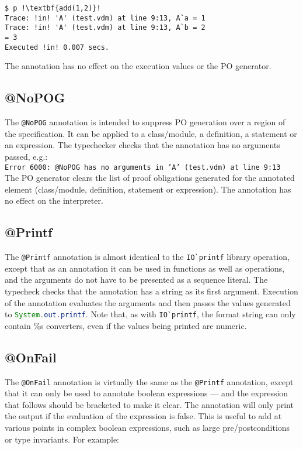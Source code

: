 \begin{lstlisting}[style=tool,escapechar=!]
$ p !\textbf{add(1,2)}!
Trace: !in! 'A' (test.vdm) at line 9:13, A`a = 1
Trace: !in! 'A' (test.vdm) at line 9:13, A`b = 2
= 3
Executed !in! 0.007 secs.
\end{lstlisting}

\noindent The annotation has no effect on the execution values or the
PO generator.

\subsection{@NoPOG}

The \lstinline[language=VDM++]|@NoPOG| annotation is intended to
suppress PO generation over a region of the specification. It can be
applied to a class/module, a definition, a statement or an
expression. The typechecker checks
that the annotation has no arguments passed, e.g.:\\

\noindent \texttt{Error 6000: @NoPOG has no arguments in 'A'
  (test.vdm) at line 9:13}\\

The PO generator clears the list of proof obligations generated for
the annotated element (class/module, definition, statement or
expression). The annotation has no effect on the interpreter.

\subsection{@Printf}

The \lstinline[language=VDM++]|@Printf| annotation is almost identical
to the \lstinline[language=VDM++]|IO`printf| library operation, except
that as an annotation it can be used in functions as well as
operations, and the arguments do not have to be presented as a
sequence literal. The typecheck checks that the annotation has a
string as its first argument. Execution of the annotation evaluates
the arguments and then passes the values generated to
\lstinline[language=Java]|System.out.printf|. Note that, as with
\lstinline[language=VDM++]|IO`printf|, the format string can only
contain \%s converters, even if the values being printed are numeric.

\subsection{@OnFail}

The \lstinline[language=VDM++]|@OnFail| annotation is virtually the
same as the \lstinline[language=VDM++]|@Printf| annotation, except
that it can only be used to annotate boolean expressions --- and the
expression that follows should be bracketed to make it clear. The
annotation will only print the output if the evaluation of the
expression is false. This is useful to add at various points in
complex boolean expressions, such as large pre/postconditions or type
invariants. For example:

